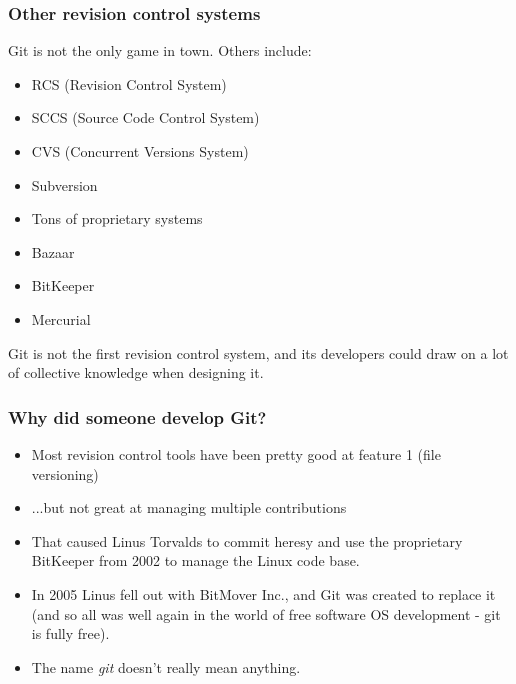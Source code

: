 \documentclass{beamer}
\begin{document}
\begin{frame}
  \frametitle{Other revision control systems}
  Git is not the only game in town. Others include:

  \begin{itemize}
  \item RCS (Revision Control System)
  \item SCCS (Source Code Control System)
  \item CVS (Concurrent Versions System)
  \item Subversion
  \item Tons of proprietary systems
  \item Bazaar
  \item BitKeeper
  \item Mercurial
  \end{itemize}

  \pause Git is not the first revision control system, and its
  developers could draw on a lot of collective knowledge when
  designing it.
\end{frame}

\begin{frame}
  \frametitle{Why did someone develop Git?}
  \begin{itemize}
    \pause \item Most revision control tools have been pretty good at
    feature 1 (file versioning)
    \pause \item ...but not great at managing multiple contributions
    \pause \item That caused Linus Torvalds to commit heresy and use the
    \alert{proprietary} BitKeeper from 2002 to manage the Linux code base.
    \pause \item In 2005 Linus fell out with BitMover Inc., and Git was
    created to replace it (and so all was well again in the world of free
    software OS development - git is fully free).
    \pause \item The name \emph{git} doesn't really mean anything.
  \end{itemize}
\end{frame}
\end{document}
